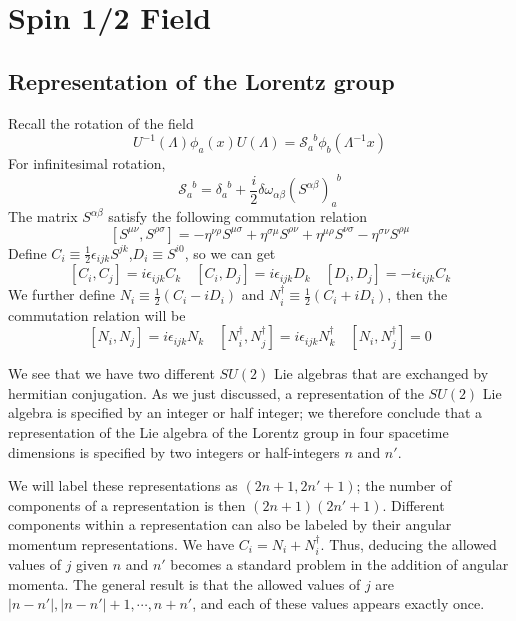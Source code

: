 \chapter{Spin 1/2 Field}
\section{Representation of the Lorentz group}
\noindent
Recall the rotation of the field
\[U^{-1}(\Lambda) \phi_a(x) U(\Lambda) = \mathcal{S}_{a}^{\phantom{a}b}\phi_b(\Lambda^{-1}x)\]
For infinitesimal rotation,
\[\mathcal{S}_{a}^{\phantom{a}b} = \delta_{a}^{\phantom{a}b}+\frac{i}{2} \delta \omega_{\alpha \beta} (S^{\alpha \beta})_{a}^{\phantom{a}b} \]
The matrix $S^{\alpha \beta}$ satisfy the following commutation relation
\[[S^{\mu \nu},S^{\rho \sigma}]= -\eta^{\nu \rho}S^{\mu \sigma} + \eta^{\sigma \mu}S^{\rho \nu} + \eta^{\mu \rho}S^{\nu \sigma} - \eta^{\sigma \nu}S^{\rho \mu}\]
Define $C_i \equiv \frac{1}{2}\epsilon_{ijk}S^{jk}$,$D_i \equiv S^{i0}$, so we can get
\[[C_i,C_j] = i\epsilon_{ijk}C_k \quad [C_i,D_j] = i\epsilon_{ijk}D_k \quad [D_i,D_j] = -i\epsilon_{ijk}C_k\]
We further define $N_i \equiv \frac{1}{2}(C_i-iD_i)$ and $N^{\dagger}_i \equiv \frac{1}{2}(C_i + i D_i)$, then the commutation relation will be
\[[N_i,N_j] = i\epsilon_{ijk}N_k \quad [N^{\dagger}_i,N^{\dagger}_j] = i\epsilon_{ijk}N^{\dagger}_k \quad [N_i,N^{\dagger}_j] = 0\]

We see that we have two different $SU(2)$ Lie algebras that are exchanged by hermitian conjugation. As we just discussed, a representation of the $SU(2)$ Lie algebra is specified by an integer or half integer; we therefore conclude that a representation of the Lie algebra of the Lorentz group in four spacetime dimensions is specified by two integers or half-integers $n$ and $n'$.

We will label these representations as $(2n+1, 2n'+1)$; the number of components of a representation is then $(2n+1)(2n'+1)$. Different components within a representation can also be labeled by their angular momentum representations. We have $C_i = N_i + N^{\dagger}_i$. Thus, deducing the allowed values of $j$ given $n$ and $n'$ becomes a standard problem in the addition of angular momenta. The general result is that the allowed values of $j$ are $|n-n'|,|n-n'|+1,\cdots, n+n'$, and each of these values appears exactly once.


